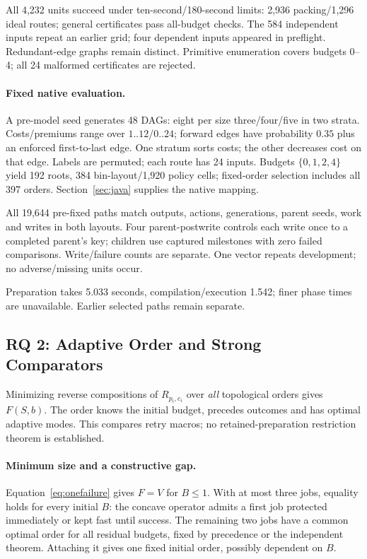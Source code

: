 \documentclass[acmsmall,screen,review,anonymous]{acmart}
\begin{document}
All 4,232 units succeed under ten-second/180-second limits: 2,936 packing/1,296 ideal routes; general certificates pass all-budget checks. The 584 independent inputs repeat an earlier grid; four dependent inputs appeared in preflight. Redundant-edge graphs remain distinct. Primitive enumeration covers budgets 0--4; all 24 malformed certificates are rejected.

\paragraph{Fixed native evaluation.}
A pre-model seed generates 48 DAGs: eight per size three/four/five in two strata. Costs/premiums range over $1..12$/$0..24$; forward edges have probability $0.35$ plus an enforced first-to-last edge. One stratum sorts costs; the other decreases cost on that edge. Labels are permuted; each route has 24 inputs. Budgets $\{0,1,2,4\}$ yield 192 roots, 384 bin-layout/1,920 policy cells; fixed-order selection includes all 397 orders. Section~\ref{sec:java} supplies the native mapping.

All 19,644 pre-fixed paths match outputs, actions, generations, parent seeds, work and writes in both layouts. Four parent-postwrite controls each write once to a completed parent's key; children use captured milestones with zero failed comparisons. Write/failure counts are separate. One vector repeats development; no adverse/missing units occur.

Preparation takes 5.033 seconds, compilation/execution 1.542; finer phase times are unavailable. Earlier selected paths remain separate.

\subsection{RQ 2: Adaptive Order and Strong Comparators}

Minimizing reverse compositions of $R_{p_i,c_i}$ over \emph{all} topological orders gives $F(S,b)$. The order knows the initial budget, precedes outcomes and has optimal adaptive modes. This compares retry macros; no retained-preparation restriction theorem is established.

\paragraph{Minimum size and a constructive gap.}
Equation~\eqref{eq:onefailure} gives $F=V$ for $B\le1$. With at most three jobs, equality holds for every initial $B$: the concave operator admits a first job protected immediately or kept fast until success. The remaining two jobs have a common optimal order for all residual budgets, fixed by precedence or the independent theorem. Attaching it gives one fixed initial order, possibly dependent on $B$.
\end{document}
